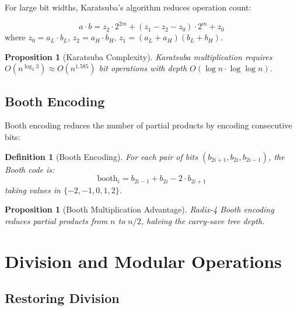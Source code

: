 \documentclass[11pt,a4paper]{article}
\newtheorem{proposition}[theorem]{Proposition}
\newtheorem{definition}[theorem]{Definition}
\begin{document}
For large bit widths, Karatsuba's algorithm reduces operation count:

\begin{equation}
a \cdot b = z_2 \cdot 2^{2m} + (z_1 - z_2 - z_0) \cdot 2^m + z_0
\end{equation}
where $z_0 = a_L \cdot b_L$, $z_2 = a_H \cdot b_H$, $z_1 = (a_L + a_H)(b_L + b_H)$.

\begin{proposition}[Karatsuba Complexity]
Karatsuba multiplication requires $O(n^{\log_2 3}) \approx O(n^{1.585})$ bit operations with depth $O(\log n \cdot \log \log n)$.
\end{proposition}

\subsection{Booth Encoding}

Booth encoding reduces the number of partial products by encoding consecutive bits:

\begin{definition}[Booth Encoding]
For each pair of bits $(b_{2i+1}, b_{2i}, b_{2i-1})$, the Booth code is:
\begin{equation}
\text{booth}_i = b_{2i-1} + b_{2i} - 2 \cdot b_{2i+1}
\end{equation}
taking values in $\{-2, -1, 0, 1, 2\}$.
\end{definition}

\begin{proposition}[Booth Multiplication Advantage]
Radix-4 Booth encoding reduces partial products from $n$ to $n/2$, halving the carry-save tree depth.
\end{proposition}

\section{Division and Modular Operations}

\subsection{Restoring Division}
\end{document}
